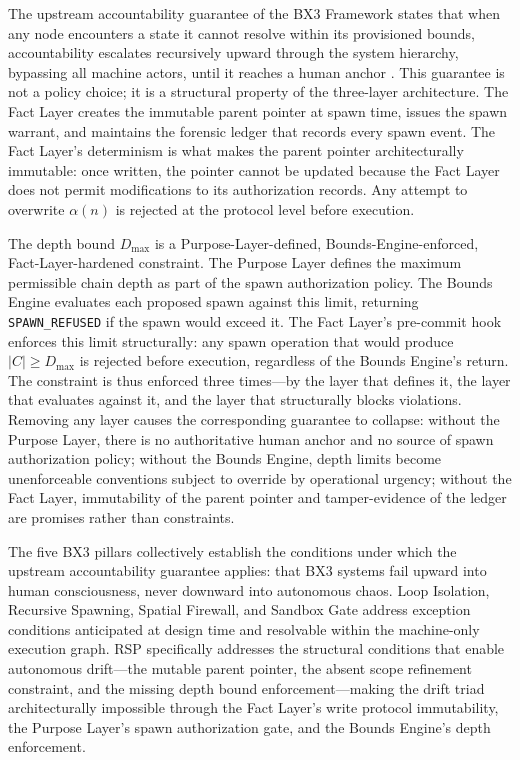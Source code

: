The upstream accountability guarantee of the BX3 Framework states that when any node encounters a state it cannot resolve within its provisioned bounds, accountability escalates recursively upward through the system hierarchy, bypassing all machine actors, until it reaches a human anchor \cite{bx3-framework,bx3framework2026}. This guarantee is not a policy choice; it is a structural property of the three-layer architecture. The Fact Layer creates the immutable parent pointer at spawn time, issues the spawn warrant, and maintains the forensic ledger that records every spawn event. The Fact Layer's determinism is what makes the parent pointer architecturally immutable: once written, the pointer cannot be updated because the Fact Layer does not permit modifications to its authorization records. Any attempt to overwrite $\alpha(n)$ is rejected at the protocol level before execution.

The depth bound $D_{\max}$ is a Purpose-Layer-defined, Bounds-Engine-enforced, Fact-Layer-hardened constraint. The Purpose Layer defines the maximum permissible chain depth as part of the spawn authorization policy. The Bounds Engine evaluates each proposed spawn against this limit, returning \texttt{SPAWN\_REFUSED} if the spawn would exceed it. The Fact Layer's pre-commit hook enforces this limit structurally: any spawn operation that would produce $|C| \geq D_{\max}$ is rejected before execution, regardless of the Bounds Engine's return. The constraint is thus enforced three times---by the layer that defines it, the layer that evaluates against it, and the layer that structurally blocks violations. Removing any layer causes the corresponding guarantee to collapse: without the Purpose Layer, there is no authoritative human anchor and no source of spawn authorization policy; without the Bounds Engine, depth limits become unenforceable conventions subject to override by operational urgency; without the Fact Layer, immutability of the parent pointer and tamper-evidence of the ledger are promises rather than constraints.

The five BX3 pillars collectively establish the conditions under which the upstream accountability guarantee applies: that BX3 systems fail upward into human consciousness, never downward into autonomous chaos. Loop Isolation, Recursive Spawning, Spatial Firewall, and Sandbox Gate address exception conditions anticipated at design time and resolvable within the machine-only execution graph. RSP specifically addresses the structural conditions that enable autonomous drift---the mutable parent pointer, the absent scope refinement constraint, and the missing depth bound enforcement---making the drift triad architecturally impossible through the Fact Layer's write protocol immutability, the Purpose Layer's spawn authorization gate, and the Bounds Engine's depth enforcement.
